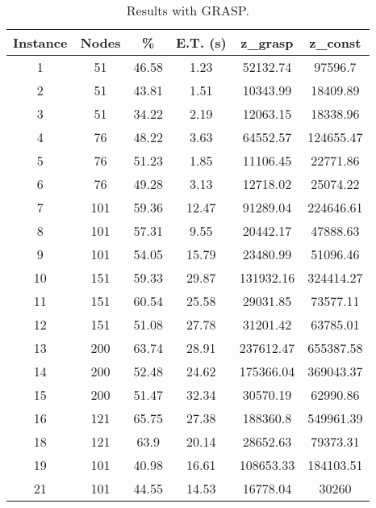 \documentclass[10pt,twoside]{article}
\begin{document}
\begin{table}[ht]
\centering
\begin{tabular}{cccccc}
\hline
\textbf{Instance} & \textbf{Nodes} & \textbf{\%} & \textbf{E.T. (s)} & \textbf{z\_grasp} & \textbf{z\_const} \\ \hline
1                 & 51             & 46.58       & 1.23              & 52132.74          & 97596.7           \\
2                 & 51             & 43.81       & 1.51              & 10343.99          & 18409.89          \\
3                 & 51             & 34.22       & 2.19              & 12063.15          & 18338.96          \\
4                 & 76             & 48.22       & 3.63              & 64552.57          & 124655.47         \\
5                 & 76             & 51.23       & 1.85              & 11106.45          & 22771.86          \\
6                 & 76             & 49.28       & 3.13              & 12718.02          & 25074.22          \\
7                 & 101            & 59.36       & 12.47             & 91289.04          & 224646.61         \\
8                 & 101            & 57.31       & 9.55              & 20442.17          & 47888.63          \\
9                 & 101            & 54.05       & 15.79             & 23480.99          & 51096.46          \\
10                & 151            & 59.33       & 29.87             & 131932.16         & 324414.27         \\
11                & 151            & 60.54       & 25.58             & 29031.85          & 73577.11          \\
12                & 151            & 51.08       & 27.78             & 31201.42          & 63785.01          \\
13                & 200            & 63.74       & 28.91             & 237612.47         & 655387.58         \\
14                & 200            & 52.48       & 24.62             & 175366.04         & 369043.37         \\
15                & 200            & 51.47       & 32.34             & 30570.19          & 62990.86          \\
16                & 121            & 65.75       & 27.38             & 188360.8          & 549961.39         \\
18                & 121            & 63.9        & 20.14             & 28652.63          & 79373.31          \\
19                & 101            & 40.98       & 16.61             & 108653.33         & 184103.51         \\
21                & 101            & 44.55       & 14.53             & 16778.04          & 30260             \\ \hline
\end{tabular}
\caption{Results with GRASP.}
\label{tab:grasp}
\end{table}
\end{document}
